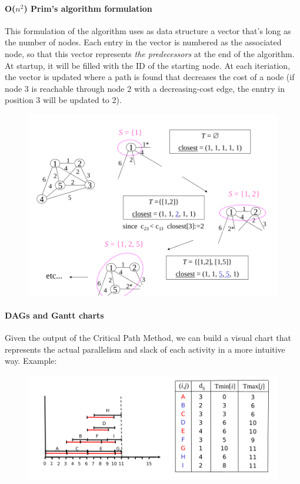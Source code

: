 \documentclass{article}
\begin{document}
			\paragraph{O($n^2$) Prim's algorithm formulation}
				This formulation of the algorithm uses as data structure a vector that's long as the number of nodes. Each entry in the vector is numbered as the associated node, so that this vector represents \textit{the predecessors} at the end of the algorithm. At startup, it will be filled with the ID of the starting node. At each iteriation, the vector is updated where a path is found that decreases the cost of a node (if node 3 is reachable through node 2 with a decreasing-cost edge, the enntry in position 3 will be updated to 2).
				\begin{figure}[H]
					\centering
					\includegraphics[width = \textwidth]{./images/Prim.png}
				\end{figure}

			\paragraph{DAGs and Gantt charts}
				Given the output of the Critical Path Method, we can build a visual chart that represents the actual parallelism and slack of each activity in a more intuitive way. Example:
				\begin{figure}[H]
					\centering
					\includegraphics[width = \textwidth]{./images/Gantt.png}
				\end{figure}
\end{document}
